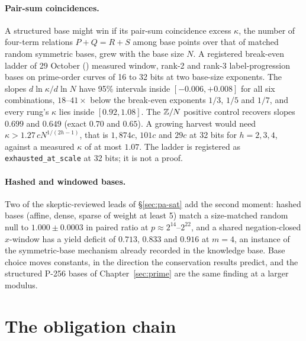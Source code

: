 \paragraph{Pair-sum coincidences.} A structured base might win if its
pair-sum coincidence excess $\kappa$, the number of four-term relations
$P+Q=R+S$ among base points over that of matched random symmetric bases,
grew with the base size $N$. A registered break-even ladder of 29 October
() measured window,
rank-2 and rank-3 label-progression bases on prime-order curves of 16 to 32
bits at two base-size exponents. The slopes $d\ln\kappa/d\ln N$ have 95\%
intervals inside $[-0.006,+0.008]$ for all six combinations, $18$--$41\times$
below the break-even exponents $1/3$, $1/5$ and $1/7$, and every rung's
$\kappa$ lies inside $[0.92,1.08]$. The $\mathbb{Z}/N$ positive control recovers
slopes $0.699$ and $0.649$ (exact $0.70$ and $0.65$). A growing harvest would
need $\kappa>1.27\,cN^{1/(2h-1)}$, that is $1{,}874c$, $101c$ and $29c$ at 32
bits for $h=2,3,4$, against a measured $\kappa$ of at most $1.07$. The
ladder is registered as \texttt{exhausted\_at\_scale} at 32 bits; it is
not a proof.

\paragraph{Hashed and windowed bases.} Two of the skeptic-reviewed leads of
\S\ref{sec:pa-sat} add the second moment: hashed bases (affine, dense,
sparse of weight at least 5) match a size-matched random null to
$1.000\pm0.0003$ in paired ratio at $p\approx2^{14}$--$2^{22}$, and a shared
negation-closed $x$-window has a yield deficit of $0.713$, $0.833$ and
$0.916$ at $m=4$, an instance of the symmetric-base mechanism already
recorded in the knowledge base. Base choice moves constants, in the
direction the conservation results predict, and the structured P-256
bases of Chapter~\ref{sec:prime} are the same finding at a larger
modulus.

\section{The obligation chain}\label{sec:pg-obligations}

